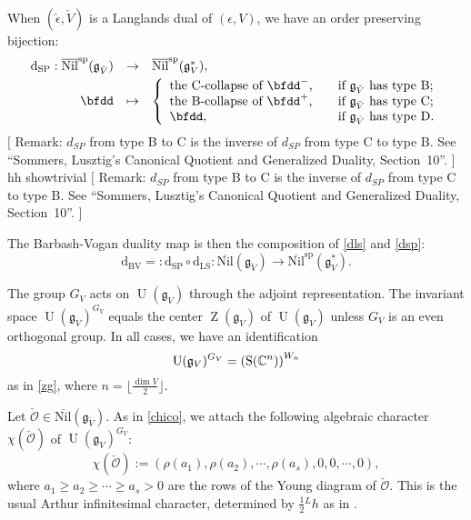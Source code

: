 \documentclass[12pt,a4paper]{amsart}
\newcommand{\trivial}[2][]{\if\relax\detokenize{#1}\relax
{\color{Bittersweet} \vspace{0em} $[$  #2 $]$}
\else
\ifx#1h
\ifcsname showtrivial\endcsname
{\color{orange} \vspace{0em}  $[$ #2 $]$}
\fi
\else {\red Wrong argument!} \fi
\fi
}
\newcommand{\CO}{{\mathcal {O}}}
\newcommand{\oS}{\operatorname{S}}
\newcommand{\oZ}{\operatorname{Z}}
\newcommand{\oU}{\operatorname{U}}
\newcommand{\g}{\mathfrak g}
\newcommand{\be}{\begin {equation}}
\newcommand{\ee}{\end {equation}}
\numberwithin{equation}{section}
\theoremstyle{remark}
\def\half{{\tfrac{1}{2}}}
\begin{document}
When $(\check \epsilon, \check V)$ is a Langlands dual of $(\epsilon, V)$, we have an order preserving bijection:
\be\label{dsp}
\begin{array}{rcl}
  \mathrm d_{\mathrm{SP}}:  \overline{\mathrm{Nil}}^{\mathrm{sp}}(\g_{\check V})&\rightarrow &\overline{\mathrm{Nil}}^{\mathrm{sp}}(\g_V^*),\smallskip\\
     \bfdd&\mapsto&
     \left\{
                \begin{array}{ll}
                  \textrm{the C-collapse of $\bfdd^-$,} \quad &\textrm{if $\g_{\check V}$ has type B;}\\
                      \textrm{the B-collapse of $\bfdd^+$,} \quad &\textrm{if $\g_{\check V}$ has type C;}\\
                      \bfdd,  \quad &\textrm{if $\g_{\check V}$ has type D.}\\
                    \end{array}
                    \right.
     \end{array}
\ee
\trivial[h]{
  Remark: $d_{SP}$ from type B to C is the inverse of $d_{SP}$ from type C to
  type B. See ``Sommers, Lusztig's Canonical Quotient and Generalized Duality,
  Section~10''.
}
The Barbash-Vogan duality map is then the composition of \eqref{dls} and \eqref{dsp}:
\begin{equation}\label{DefBV}
   \mathrm d_{\mathrm{BV}}=:    \mathrm d_{\mathrm{SP}}\circ \mathrm d_{\mathrm{LS} }: \overline{\mathrm{Nil}}(\g_{\check V})\rightarrow \overline{\mathrm{Nil}}^{\mathrm{sp}}(\g_{V}^*).
\end{equation}

The group $G_V$ acts on $\oU(\g_V)$ through the adjoint representation. The invariant space $\oU(\g_V)^{G_V}$ equals the center $\oZ(\g_V)$ of $\oU(\g_V)$ unless $G_V$ is an even orthogonal group. In all cases, we have an identification
\[
 \oU(\g_V)^{G_V}=\left(\oS(\C^n)\right)^{W_n}
\]
 as in \eqref{zg}, where $n=\lfloor\frac{\dim V}{2}\rfloor$.

Let $\check \CO\in \overline{\mathrm{Nil}}(\g_{\check V})$. As in \eqref{chico}, we attach the following algebraic character $\chi(\check \CO)$ of $\oU(\g_V)^{G_V}$:
\begin{equation}\label{usual-chico}
 \chi(\check \CO):= (\rho( a_1), \rho(a_2),  \cdots, \rho(a_s), 0, 0, \cdots, 0 ),
\end{equation}
where $a_1\geq  a_2\geq \cdots\geq a_s>0$ are the rows of the Young diagram of $\check \CO$. This is the usual Arthur infinitesimal character, determined by $\half {^{L}h}$ as in
  \cite[Equation~(1.15)]{BVUni}.
\end{document}
